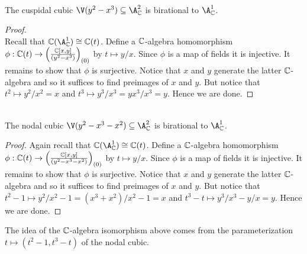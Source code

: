 \documentclass[a4paper]{article}
\begin{document}
\begin{eg}{}{}\\
The cuspidal cubic $\V(y^2-x^3)\subseteq\A_\C^2$ is birational to $\A_\C^1$. 
\begin{proof}\\
Recall that $\C(\A_\C^1)\cong\C(t)$. Define a $\mathbb{C}$-algebra homomorphism $\phi:\mathbb{C}(t)\to\left(\frac{\mathbb{C}[x,y]}{(y^2-x^3)}\right)_{(0)}$ by $t\mapsto y/x$. Since $\phi$ is a map of fields it is injective. It remains to show that $\phi$ is surjective. Notice that $x$ and $y$ generate the latter $\mathbb{C}$-algebra and so it suffices to find preimages of $x$ and $y$. But notice that $t^2\mapsto y^2/x^2=x$ and $t^3\mapsto y^3/x^3=yx^3/x^3=y$. Hence we are done. 
\end{proof}
\end{eg}

\begin{eg}{}{}\\
The nodal cubic $\V(y^2-x^3-x^2)\subseteq\A_\C^2$ is birational to $\A_\C^1$. 
\begin{proof}
Again recall that $\C(\A_\C^1)\cong\C(t)$. Define a $\mathbb{C}$-algebra homomorphism $\phi:\mathbb{C}(t)\to\left(\frac{\mathbb{C}[x,y]}{(y^2-x^3-x^2)}\right)_{(0)}$ by $t\mapsto y/x$. Since $\phi$ is a map of fields it is injective. It remains to show that $\phi$ is surjective. Notice that $x$ and $y$ generate the latter $\mathbb{C}$-algebra and so it suffices to find preimages of $x$ and $y$. But notice that $t^2-1\mapsto y^2/x^2-1=(x^3+x^2)/x^2-1=x$ and $t^3-t\mapsto y^3/x^3-y/x=y$. Hence we are done. 
\end{proof}
\end{eg}

The idea of the $\mathbb{C}$-algebra isomorphism above comes from the parameterization $t\mapsto(t^2-1,t^3-t)$ of the nodal cubic. 
\end{document}
